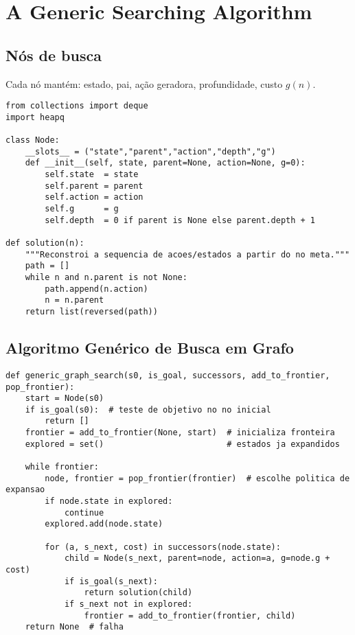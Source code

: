 \documentclass[9pt,a4paper]{extarticle}
\begin{document}
\section{A Generic Searching Algorithm}

\subsection*{Nós de busca}
Cada nó mantém: estado, pai, ação geradora, profundidade, custo $g(n)$.

\begin{lstlisting}
from collections import deque
import heapq

class Node:
    __slots__ = ("state","parent","action","depth","g")
    def __init__(self, state, parent=None, action=None, g=0):
        self.state  = state
        self.parent = parent
        self.action = action
        self.g      = g
        self.depth  = 0 if parent is None else parent.depth + 1

def solution(n):
    """Reconstroi a sequencia de acoes/estados a partir do no meta."""
    path = []
    while n and n.parent is not None:
        path.append(n.action)
        n = n.parent
    return list(reversed(path))
\end{lstlisting}

\subsection*{Algoritmo Genérico de Busca em Grafo}
\begin{lstlisting}
def generic_graph_search(s0, is_goal, successors, add_to_frontier, pop_frontier):
    start = Node(s0)
    if is_goal(s0):  # teste de objetivo no no inicial
        return []
    frontier = add_to_frontier(None, start)  # inicializa fronteira
    explored = set()                         # estados ja expandidos

    while frontier:
        node, frontier = pop_frontier(frontier)  # escolhe politica de expansao
        if node.state in explored:
            continue
        explored.add(node.state)

        for (a, s_next, cost) in successors(node.state):
            child = Node(s_next, parent=node, action=a, g=node.g + cost)
            if is_goal(s_next):
                return solution(child)
            if s_next not in explored:
                frontier = add_to_frontier(frontier, child)
    return None  # falha
\end{lstlisting}
\end{document}
